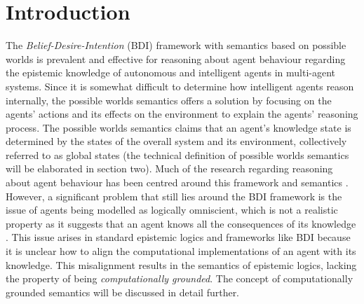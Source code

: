 \documentclass{sn-jnl}
\theoremstyle{thmstyleone}%
\theoremstyle{thmstyletwo}%
\theoremstyle{thmstylethree}%
\begin{document}
\section{Introduction}\label{sec1}

The \emph{Belief-Desire-Intention} (BDI) framework with semantics based on possible worlds is prevalent and effective for reasoning about agent behaviour regarding the epistemic knowledge of autonomous and intelligent agents in multi-agent systems. Since it is somewhat difficult to determine how intelligent agents reason internally, the possible worlds semantics offers a solution by focusing on the agents' actions and its effects on the environment to explain the agents' reasoning process. The possible worlds semantics claims that an agent's knowledge state is determined by the states of the overall system and its environment, collectively referred to as global states (the technical definition of possible worlds semantics will be elaborated in section two). Much of the research regarding reasoning about agent behaviour has been centred around this framework and semantics \cite{10.1007/3-540-49057-4_1}. However, a significant problem that still lies around the BDI framework is the issue of agents being modelled as logically omniscient, which is not a realistic property as it suggests that an agent knows all the consequences of its knowledge \cite{DBLP:books/mit/FHMV1995, alma990002228290206881}. This issue arises in standard epistemic logics and frameworks like BDI because it is unclear how to align the computational implementations of an agent with its knowledge. \cite{DBLP:conf/mallow/AlechinaL10} This misalignment results in the semantics of epistemic logics, lacking the property of being \emph{computationally grounded}. The concept of computationally grounded semantics will be discussed in detail further. \par 

\printbibliography%
\end{document}
